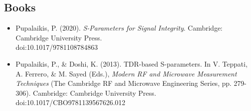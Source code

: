 \documentclass[10pt,letterpaper]{extarticle}
\newenvironment{indentsection}[1]%
{\begin{list}{}%
	{\setlength{\leftmargin}{#1}}%
	\item[]%
}
{\end{list}}
\begin{document}
\vspace{-1em}\subsection*{\Large Books}\vspace{-0.5em}
\begin{indentsection}{-1em}\begin{itemize}
\parskip=-0.2em
\item Pupalaikis, P. (2020). \emph{S-Parameters for Signal Integrity}. Cambridge: Cambridge University Press.\\ doi:10.1017/9781108784863
\item Pupalaikis, P., \& Doshi, K. (2013). TDR-based S-parameters. In V. Teppati, A. Ferrero, \& M. Sayed (Eds.), \emph{Modern RF and Microwave Measurement Techniques} (The Cambridge RF and Microwave Engineering Series, pp. 279-306). Cambridge: Cambridge University Press. doi:10.1017/CBO9781139567626.012
\end{itemize}\end{indentsection}
\end{document}
